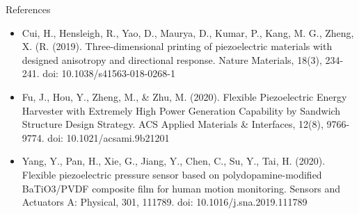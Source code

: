 \documentclass[hyperref=pdftex, presentation]{beamer}
\begin{document}
\begin{frame}{References}
	\begin{itemize}
		\item Cui, H., Hensleigh, R., Yao, D., Maurya, D., Kumar, P., Kang, M. G., Zheng, X. (R. (2019). Three-dimensional printing of piezoelectric materials with designed anisotropy and directional response. Nature Materials, 18(3), 234-241. doi: 10.1038/s41563-018-0268-1
		\item Fu, J., Hou, Y., Zheng, M., \& Zhu, M. (2020). Flexible Piezoelectric Energy Harvester with Extremely High Power Generation Capability by Sandwich Structure Design Strategy. ACS Applied Materials \& Interfaces, 12(8), 9766-9774. doi: 10.1021/acsami.9b21201
		\item Yang, Y., Pan, H., Xie, G., Jiang, Y., Chen, C., Su, Y.,  Tai, H. (2020). Flexible piezoelectric pressure sensor based on polydopamine-modified BaTiO3/PVDF composite film for human motion monitoring. Sensors and Actuators A: Physical, 301, 111789. doi: 10.1016/j.sna.2019.111789
	\end{itemize}
\end{frame}
\end{document}
